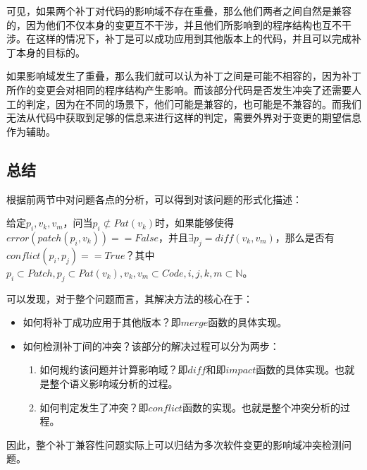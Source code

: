 可见，如果两个补丁对代码的影响域不存在重叠，那么他们两者之间自然是兼容的，因为他们不仅本身的变更互不干涉，并且他们所影响到的程序结构也互不干涉。在这样的情况下，补丁是可以成功应用到其他版本上的代码，并且可以完成补丁本身的目标的。

如果影响域发生了重叠，那么我们就可以认为补丁之间是可能不相容的，因为补丁所作的变更会对相同的程序结构产生影响。而该部分代码是否发生冲突了还需要人工的判定，因为在不同的场景下，他们可能是兼容的，也可能是不兼容的。而我们无法从代码中获取到足够的信息来进行这样的判定，需要外界对于变更的期望信息作为辅助。

%

\subsection{总结}

根据前两节中对问题各点的分析，可以得到对该问题的形式化描述：

给定$p_i,v_k,v_m$，问当$p_i \not \subset Pat(v_k)$时，如果能够使得$error(patch(p_i,v_k)) == False$，并且$\exists p_j = diff(v_k,v_m)$，那么是否有$conflict(p_i,p_j) == True$？其中$p_i \subset Patch,p_j \subset Pat(v_k),v_k,v_m \subset Code,i,j,k,m \subset \mathbb{N}$。


可以发现，对于整个问题而言，其解决方法的核心在于：
\begin{itemize}
	\item 如何将补丁成功应用于其他版本？即$merge$函数的具体实现。
	\item 如何检测补丁间的冲突？该部分的解决过程可以分为两步：
	\begin{enumerate}
		\item 如何规约该问题并计算影响域？即$diff$和即$impact$函数的具体实现。也就是整个语义影响域分析的过程。
		\item 如何判定发生了冲突？即$conflict$函数的实现。也就是整个冲突分析的过程。		
	\end{enumerate}
\end{itemize}

因此，整个补丁兼容性问题实际上可以归结为多次软件变更的影响域冲突检测问题。


